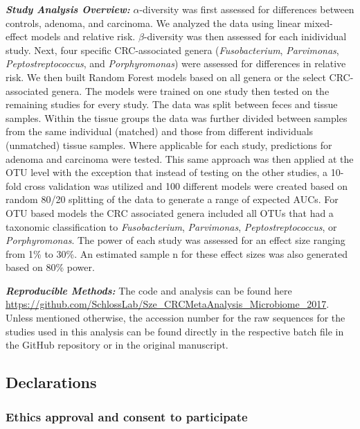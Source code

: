 \documentclass[12pt,]{article}
\begin{document}
\textbf{\emph{Study Analysis Overview:}} \(\alpha\)-diversity was first
assessed for differences between controls, adenoma, and carcinoma. We
analyzed the data using linear mixed-effect models and relative risk.
\(\beta\)-diversity was then assessed for each inidividual study. Next,
four specific CRC-associated genera (\emph{Fusobacterium},
\emph{Parvimonas}, \emph{Peptostreptococcus}, and \emph{Porphyromonas})
were assessed for differences in relative risk. We then built Random
Forest models based on all genera or the select CRC-associated genera.
The models were trained on one study then tested on the remaining
studies for every study. The data was split between feces and tissue
samples. Within the tissue groups the data was further divided between
samples from the same individual (matched) and those from different
individuals (unmatched) tissue samples. Where applicable for each study,
predictions for adenoma and carcinoma were tested. This same approach
was then applied at the OTU level with the exception that instead of
testing on the other studies, a 10-fold cross validation was utilized
and 100 different models were created based on random 80/20 splitting of
the data to generate a range of expected AUCs. For OTU based models the
CRC associated genera included all OTUs that had a taxonomic
classification to \emph{Fusobacterium}, \emph{Parvimonas},
\emph{Peptostreptococcus}, or \emph{Porphyromonas}. The power of each
study was assessed for an effect size ranging from 1\% to 30\%. An
estimated sample n for these effect sizes was also generated based on
80\% power.

\textbf{\emph{Reproducible Methods:}} The code and analysis can be found
here
\url{https://github.com/SchlossLab/Sze_CRCMetaAnalysis_Microbiome_2017}.
Unless mentioned otherwise, the accession number for the raw sequences
for the studies used in this analysis can be found directly in the
respective batch file in the GitHub repository or in the original
manuscript.

\newpage

\subsection{Declarations}\label{declarations}

\subsubsection{Ethics approval and consent to
participate}\label{ethics-approval-and-consent-to-participate}
\end{document}
